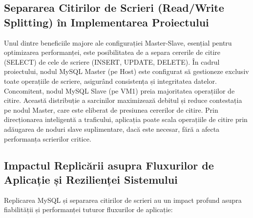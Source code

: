 \documentclass[12pt, a4paper, oneside, romanian]{teza-upb}
\begin{document}
\subsection{Separarea Citirilor de Scrieri (Read/Write Splitting) în Implementarea Proiectului}
Unul dintre beneficiile majore ale configurației Master-Slave, esențial pentru optimizarea performanței, este posibilitatea de a separa cererile de citire (SELECT) de cele de scriere (INSERT, UPDATE, DELETE). În cadrul proiectului, nodul MySQL Master (pe Host) este configurat să gestioneze exclusiv toate operațiile de scriere, asigurând consistența și integritatea datelor. Concomitent, nodul MySQL Slave (pe VM1) preia majoritatea operațiilor de citire. Această distribuție a sarcinilor maximizează debitul și reduce contestația pe nodul Master, care este eliberat de presiunea cererilor de citire. Prin direcționarea inteligentă a traficului, aplicația poate scala operațiile de citire prin adăugarea de noduri slave suplimentare, dacă este necesar, fără a afecta performanța scrierilor critice.

\subsection{Impactul Replicării asupra Fluxurilor de Aplicație și Rezilienței Sistemului}
Replicarea MySQL și separarea citirilor de scrieri au un impact profund asupra fiabilității și performanței tuturor fluxurilor de aplicație:
\end{document}
